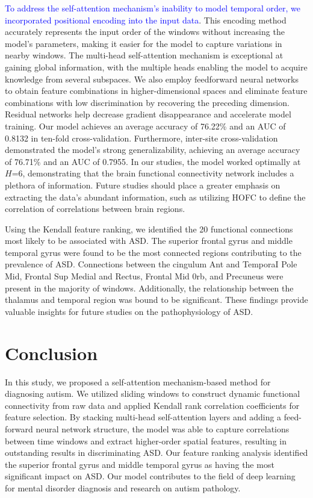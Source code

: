 \documentclass[a4paper]{cas-dc}
\begin{document}
\textcolor{blue}{To address the self-attention mechanism's inability to model temporal order, we incorporated positional encoding into the input data}. This encoding method accurately represents the input order of the windows without increasing the model's parameters, making it easier for the model to capture variations in nearby windows. The multi-head self-attention mechanism is exceptional at gaining global information, with the multiple heads enabling the model to acquire knowledge from several subspaces. We also employ feedforward neural networks to obtain feature combinations in higher-dimensional spaces and eliminate feature combinations with low discrimination by recovering the preceding dimension. Residual networks help decrease gradient disappearance and accelerate model training. Our model achieves an average accuracy of 76.22\% and an AUC of 0.8132 in ten-fold cross-validation. Furthermore, inter-site cross-validation demonstrated the model's strong generalizability, achieving an average accuracy of 76.71\% and an AUC of 0.7955. In our studies, the model worked optimally at $H$=6, demonstrating that the brain functional connectivity network includes a plethora of information. Future studies should place a greater emphasis on extracting the data's abundant information, such as utilizing HOFC to define the correlation of correlations between brain regions.

Using the Kendall feature ranking, we identified the 20 functional connections most likely to be associated with ASD. The superior frontal gyrus and middle temporal gyrus were found to be the most connected regions contributing to the prevalence of ASD. Connections between the cingulum Ant and TemporaI Pole Mid, Frontal Sup Medial and Rectus, Frontal Mid 0rb, and Precuneus were present in the majority of windows. Additionally, the relationship between the thalamus and temporal region was bound to be significant. These findings provide valuable insights for future studies on the pathophysiology of ASD.
\section{Conclusion}
In this study, we proposed a self-attention mechanism-based method for diagnosing autism. We utilized sliding windows to construct dynamic functional connectivity from raw data and applied Kendall rank correlation coefficients for feature selection. By stacking multi-head self-attention layers and adding a feed-forward neural network structure, the model was able to capture correlations between time windows and extract higher-order spatial features, resulting in outstanding results in discriminating ASD. Our feature ranking analysis identified the superior frontal gyrus and middle temporal gyrus as having the most significant impact on ASD. Our model contributes to the field of deep learning for mental disorder diagnosis and research on autism pathology.

%





\end{document}
